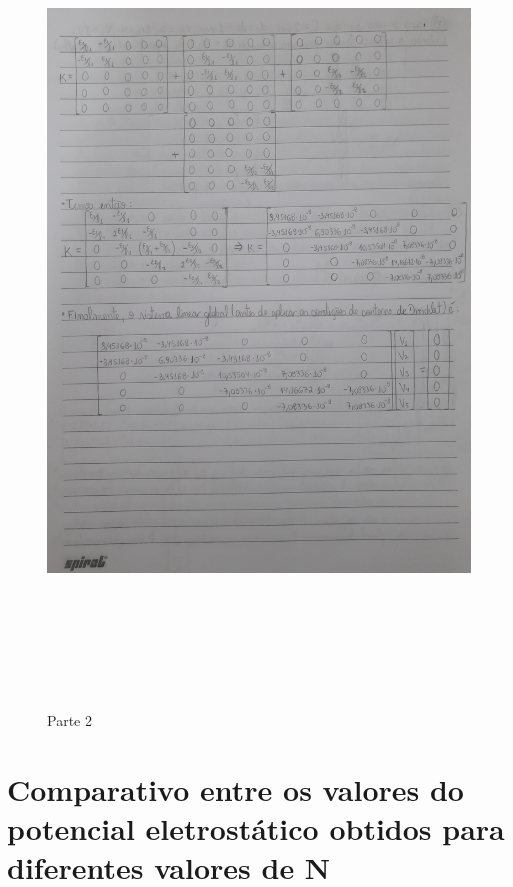 \documentclass[10pt]{article}
\begin{document}
\begin{itemize}
    \begin{figure}[!htb]
    \centerline{\includegraphics[width=20cm,height=22cm]{FormulaçõesExtras/f2.jpg}}
    \caption{Parte 2}
    \label{fig:f2}
    \end{figure}
    
    \end{itemize}
    
\section{Comparativo entre os valores do potencial eletrostático obtidos para diferentes valores de N}
    
\end{document}
